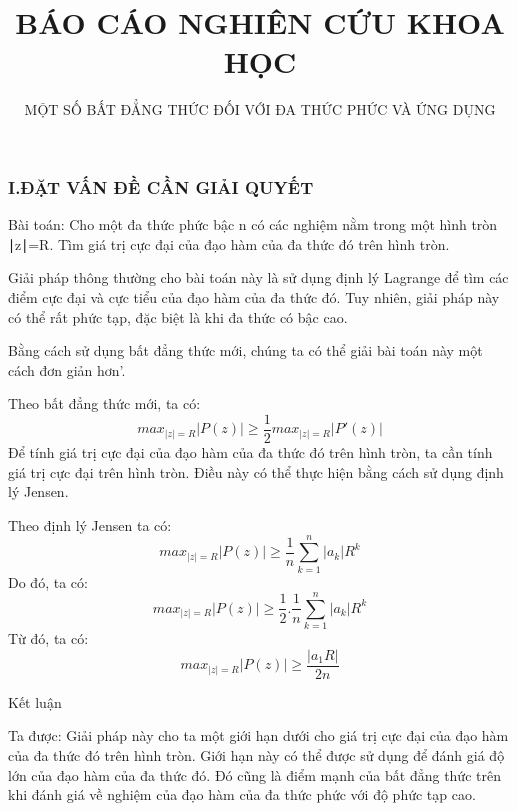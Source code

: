 \documentclass{beamer}
\title
{BÁO CÁO NGHIÊN CỨU KHOA HỌC}
\subtitle{
MỘT SỐ BẤT ĐẲNG THỨC ĐỐI VỚI ĐA THỨC PHỨC VÀ ỨNG DỤNG }
\institute[VFU]
{Giảng viên hướng dẫn: \vspace{0.3cm} \textbf{PGS.TS KIỀU PHƯƠNG CHI}\par
Chủ nhiệm đề tài: \textbf{MAI HOÀNG PHÚC}}
\begin{document}
\frame{\titlepage}
\begin{frame}
\frametitle{I.ĐẶT VẤN ĐỀ CẦN GIẢI QUYẾT}
\begin{block}{Bài toán:}
 Cho một đa thức phức bậc n có các nghiệm nằm trong một hình tròn ∣z∣=R. Tìm giá trị cực đại của đạo hàm của đa thức đó trên hình tròn.
\end{block}
\vspace{0.5cm}
Giải pháp thông thường cho bài toán này là sử dụng định lý Lagrange để tìm các điểm cực đại và cực tiểu của đạo hàm của đa thức đó. Tuy nhiên, giải pháp này có thể rất phức tạp, đặc biệt là khi đa thức có bậc cao.\par
Bằng cách sử dụng bất đẳng thức mới, chúng ta có thể giải bài toán này một cách đơn giản hơn'.
\end{frame}
\begin{frame}
Theo bất đẳng thức mới, ta có:
\[max_{|z|=R} |P(z)| \ge \frac{1}{2}max_{|z|=R} 
|P'(z)|\]
Để tính giá trị cực đại của đạo hàm của đa thức đó trên hình tròn, ta cần tính giá trị cực đại trên hình tròn. Điều này có thể thực hiện bằng cách sử dụng định lý Jensen.\par
Theo định lý Jensen ta có:
\[max_{|z|=R}|P(z)| \ge \frac{1}{n}\sum_{k=1}^n |a_k|R^k\]
Do đó, ta có:
\[max_{|z|=R}|P(z)| \ge \frac{1}{2}.\frac{1}{n}\sum_{k=1}^n |a_k|R^k\]
Từ đó, ta có:
\[max_{|z|=R} |P(z)| \ge \frac{|a_1R|}{2n}\]
\end{frame}
\begin{frame}{Kết luận}
\begin{block}{Ta được:}
 Giải pháp này cho ta một giới hạn dưới cho giá trị cực đại của đạo hàm của đa thức đó trên hình tròn. Giới hạn này có thể được sử dụng để đánh giá độ lớn của đạo hàm của đa thức đó. Đó cũng là điểm mạnh của bất đẳng thức trên khi đánh giá về nghiệm của đạo hàm của đa thức phức với độ phức tạp cao. 
\end{block}


\end{frame}
\end{document}
